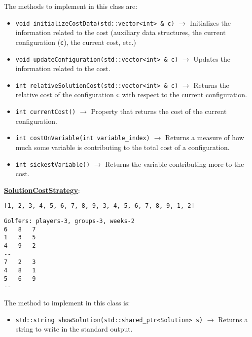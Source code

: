 The methods to implement in this class are:

\begin{itemize}
\item \verb|void initializeCostData(std::vector<int> & c)| $\rightarrow$ Initializes the information related to the cost (auxiliary data structures, the current configuration (\verb|c|), the current cost, etc.)
\item \verb|void updateConfiguration(std::vector<int> & c)| $\rightarrow$ Updates the information related to the cost.
\item \verb|int relativeSolutionCost(std::vector<int> & c)| $\rightarrow$ Returns the relative cost of the configuration \verb|c| with respect to the current configuration.
\item \verb|int currentCost()| $\rightarrow$ Property that returns the cost of the current configuration.
\item \verb|int costOnVariable(int variable_index)| $\rightarrow$ Returns a measure of how much some variable is contributing to the total cost of a configuration. 
\item \verb|int sickestVariable()| $\rightarrow$ Returns the variable contributing more to the cost.
\end{itemize}

\underline{\textbf{SolutionCostStrategy}}: 

\begin{Verbatim}
[1, 2, 3, 4, 5, 6, 7, 8, 9, 3, 4, 5, 6, 7, 8, 9, 1, 2]
\end{Verbatim}


\begin{Verbatim}
Golfers: players-3, groups-3, weeks-2
6	8	7	
1	3	5	
4	9	2	
--
7	2	3	
4	8	1	
5	6	9	
--
\end{Verbatim}

The method to implement in this class is:

\begin{itemize}
\item \verb|std::string showSolution(std::shared_ptr<Solution> s)| $\rightarrow$ Returns a string to write in the standard output.
\end{itemize}